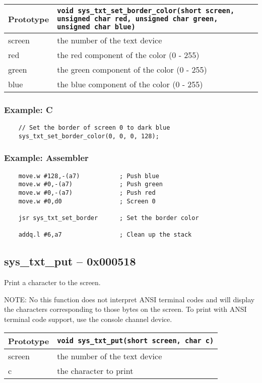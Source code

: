 \bigskip

\begin{tabular}{|l||l|} \hline
Prototype & \lstinline!void sys_txt_set_border_color(short screen, unsigned char red, unsigned char green, unsigned char blue)! \\ \hline
screen & the number of the text device \\ \hline
red & the red component of the color (0 - 255) \\ \hline
green & the green component of the color (0 - 255) \\ \hline
blue & the blue component of the color (0 - 255) \\ \hline
\end{tabular}

\subsubsection*{Example: C}
\begin{lstlisting}
    // Set the border of screen 0 to dark blue
    sys_txt_set_border_color(0, 0, 0, 128);
\end{lstlisting}

\subsubsection*{Example: Assembler}
\begin{verbatim}
    move.w #128,-(a7)           ; Push blue
    move.w #0,-(a7)             ; Push green
    move.w #0,-(a7)             ; Push red
    move.w #0,d0                ; Screen 0

    jsr sys_txt_set_border      ; Set the border color

    addq.l #6,a7                ; Clean up the stack
\end{verbatim}

\subsection*{sys\_txt\_put -- 0x000518}
Print a character to the screen.

NOTE: No this function does not interpret ANSI terminal codes and will display
the characters corresponding to those bytes on the screen. To print with ANSI
terminal code support, use the console channel device.

\bigskip

\begin{tabular}{|l||l|} \hline
Prototype & \lstinline!void sys_txt_put(short screen, char c)! \\ \hline
screen & the number of the text device \\ \hline
c & the character to print \\ \hline
\end{tabular}

